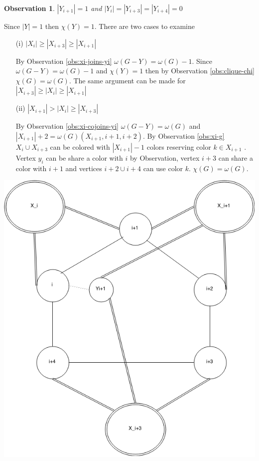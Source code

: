 \documentclass[12pt]{article}
\newtheorem{Observation}[Theorem]{Observation}
\begin{document}
\begin{Observation}\label{obs:yi1}
$|Y_{i+1}| = 1$ and $|Y_i| = |Y_{i+3}| = |Y_{i+4}| = 0$
\end{Observation}
\begin{minipage}{0.5\textwidth}%
	 Since $|Y| = 1$ then $\chi(Y) = 1$. There are two cases to examine

	\begin{itemize}
	\item[(i)]
		$|X_i| \geq |X_{i+3}| \geq |X_{i+1}|$

		By Observation \ref{obs:xi-joins-yi} $\omega(G - Y) = \omega(G) - 1$.  Since $\omega(G - Y) = \omega(G) - 1$ and $\chi(Y) = 1$ then by Observation \ref{obs:clique-chi} $\chi(G) = \omega(G)$. The same argument can be made for $|X_{i+3}| \geq |X_i| \geq |X_{i+1}|$ 

	\item[(ii)]
		$|X_{i+1}| > |X_i| \geq |X_{i+3}|$

		By Observation \ref{obs:xi-cojoins-yi} $\omega(G - Y) = \omega(G)$ and $|X_{i+1}| + 2 = \omega(G) (X_{i+1}, i+1,i+2)$. By Observation \ref{obs:xi-g} $X_{i} \cup X_{i+3}$ can be colored with $|X_{i+1}| - 1$ colors reserving color $k \in X_{i+1}$ . Vertex $y_i$ can be share a color with $i$ by Observation, vertex $i+3$ can share a color with $i+1$ and vertices $i+2 \cup i+4$ can use color $k$. $\chi(G) = \omega(G)$.
	\end{itemize}
\end{minipage}
\hfill
\begin{minipage}{0.5\textwidth}\raggedleft
	\includegraphics[width=\linewidth]{Yi1.png}
\end{minipage}
\end{document}
